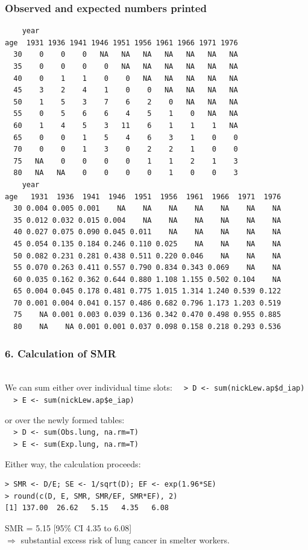 \documentclass[handout,12pt]{beamer}
\begin{document}
\begin{frame} [fragile]
\frametitle{Observed and expected numbers printed}
 
{\scriptsize
\renewcommand{\baselinestretch}{0.9}  
\begin{verbatim} 
    year      
age  1931 1936 1941 1946 1951 1956 1961 1966 1971 1976
  30    0    0    0   NA   NA   NA   NA   NA   NA   NA
  35    0    0    0    0   NA   NA   NA   NA   NA   NA
  40    0    1    1    0    0   NA   NA   NA   NA   NA
  45    3    2    4    1    0    0   NA   NA   NA   NA
  50    1    5    3    7    6    2    0   NA   NA   NA
  55    0    5    6    6    4    5    1    0   NA   NA
  60    1    4    5    3   11    6    1    1    1   NA
  65    0    0    1    5    4    6    3    1    0    0
  70    0    0    1    3    0    2    2    1    0    0
  75   NA    0    0    0    0    1    1    2    1    3
  80   NA   NA    0    0    0    0    1    0    0    3
    year
age   1931  1936  1941  1946  1951  1956  1961  1966  1971  1976
  30 0.004 0.005 0.001    NA    NA    NA    NA    NA    NA    NA
  35 0.012 0.032 0.015 0.004    NA    NA    NA    NA    NA    NA
  40 0.027 0.075 0.090 0.045 0.011    NA    NA    NA    NA    NA
  45 0.054 0.135 0.184 0.246 0.110 0.025    NA    NA    NA    NA
  50 0.082 0.231 0.281 0.438 0.511 0.220 0.046    NA    NA    NA
  55 0.070 0.263 0.411 0.557 0.790 0.834 0.343 0.069    NA    NA
  60 0.035 0.162 0.362 0.644 0.880 1.108 1.155 0.502 0.104    NA
  65 0.004 0.045 0.178 0.481 0.775 1.015 1.314 1.240 0.539 0.122
  70 0.001 0.004 0.041 0.157 0.486 0.682 0.796 1.173 1.203 0.519
  75    NA 0.001 0.003 0.039 0.136 0.342 0.470 0.498 0.955 0.885
  80    NA    NA 0.001 0.001 0.037 0.098 0.158 0.218 0.293 0.536     
\end{verbatim}         
\renewcommand{\baselinestretch}{1.0} 
}
\end{frame} 
\begin{frame} [fragile]
\frametitle{6. Calculation of SMR}
\ \\
We can sum either over individual time slots:
\verb|  > D <- sum(nickLew.ap$d_iap)| \\
\verb|  > E <- sum(nickLew.ap$e_iap)| 

or over the newly formed tables:\\
\verb|  > D <- sum(Obs.lung, na.rm=T)| \\
\verb|  > E <- sum(Exp.lung, na.rm=T)|

\medskip
Either way, the calculation proceeds:
\small
\begin{verbatim}
> SMR <- D/E; SE <- 1/sqrt(D); EF <- exp(1.96*SE)
> round(c(D, E, SMR, SMR/EF, SMR*EF), 2) 
[1] 137.00  26.62   5.15   4.35   6.08
\end{verbatim}
SMR = 5.15 [95\% CI 4.35 to 6.08] \\
$\Rightarrow$ 
substantial excess risk of lung cancer in smelter workers.
\end{frame} 
\end{document}
